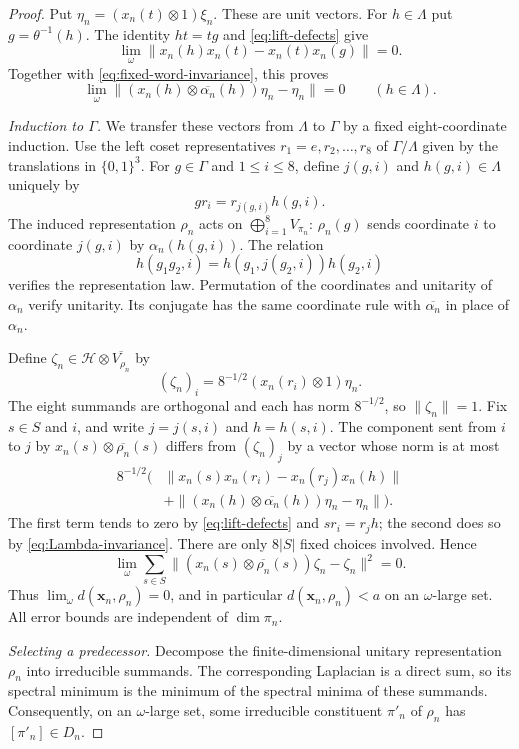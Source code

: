 \begin{proof}
Put $\eta_n=(x_n(t)\otimes1)\xi_n$.  These are unit vectors.  For
$h\in\Lambda$ put $g=\theta^{-1}(h)$.  The identity $ht=tg$ and
\eqref{eq:lift-defects} give
\[
 \lim_\omega\|x_n(h)x_n(t)-x_n(t)x_n(g)\|=0.
\]
Together with \eqref{eq:fixed-word-invariance}, this proves
\begin{equation}
 \lim_\omega
 \|(x_n(h)\otimes\overline{\alpha_n}(h))\eta_n-\eta_n\|=0
 \qquad(h\in\Lambda).
 \label{eq:Lambda-invariance}
\end{equation}

\emph{Induction to $\Gamma$.}
We transfer these vectors from $\Lambda$ to $\Gamma$ by a fixed
eight-coordinate induction.  Use the left coset representatives
$r_1=e,r_2,\ldots,r_8$ of $\Gamma/\Lambda$ given by the translations
in $\{0,1\}^3$.  For $g\in\Gamma$ and $1\leq i\leq8$, define
$j(g,i)$ and $h(g,i)\in\Lambda$ uniquely by
\[
 gr_i=r_{j(g,i)}h(g,i).
\]
The induced representation $\rho_n$ acts on
$\bigoplus_{i=1}^8 V_{\pi_n}$: $\rho_n(g)$ sends coordinate
$i$ to coordinate $j(g,i)$ by $\alpha_n(h(g,i))$.  The relation
\[
 h(g_1g_2,i)=h(g_1,j(g_2,i))h(g_2,i)
\]
verifies the representation law.  Permutation of the coordinates and
unitarity of $\alpha_n$ verify unitarity.  Its conjugate has the same
coordinate rule with $\overline{\alpha_n}$ in place of $\alpha_n$.

Define $\zeta_n\in\mathcal H\otimes\overline{V_{\rho_n}}$ by
\[
 (\zeta_n)_i=8^{-1/2}(x_n(r_i)\otimes1)\eta_n.
\]
The eight summands are orthogonal and each has norm $8^{-1/2}$, so
$\|\zeta_n\|=1$.  Fix $s\in S$ and $i$, and write
$j=j(s,i)$ and $h=h(s,i)$.  The component sent from $i$ to $j$ by
$x_n(s)\otimes\overline{\rho_n}(s)$ differs from $(\zeta_n)_j$
by a vector whose norm is at most
\begin{align*}
 8^{-1/2}\big(&\|x_n(s)x_n(r_i)-x_n(r_j)x_n(h)\|\\
 &+\|(x_n(h)\otimes\overline{\alpha_n}(h))\eta_n-\eta_n\|\big).
\end{align*}
The first term tends to zero by \eqref{eq:lift-defects} and
$sr_i=r_jh$; the second does so by \eqref{eq:Lambda-invariance}.
There are only $8|S|$ fixed choices involved.  Hence
\[
 \lim_\omega\sum_{s\in S}
 \|(x_n(s)\otimes\overline{\rho_n}(s))\zeta_n-\zeta_n\|^2=0.
\]
Thus $\lim_\omega d(\mathbf x_n,\rho_n)=0$, and in particular
$d(\mathbf x_n,\rho_n)<a$ on an $\omega$-large set.
All error bounds are independent of $\dim\pi_n$.

\emph{Selecting a predecessor.}
Decompose the finite-dimensional unitary representation $\rho_n$ into
irreducible summands.  The corresponding Laplacian is a direct sum,
so its spectral minimum is the minimum of the spectral minima of
these summands.  Consequently, on an $\omega$-large set, some
irreducible constituent $\pi'_n$ of $\rho_n$ has $[\pi'_n]\in D_n$.


\end{proof}
